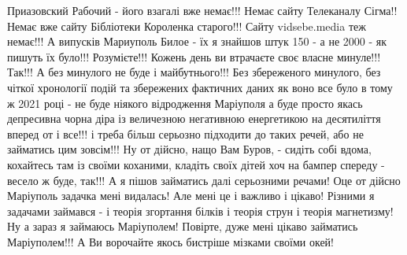 Приазовский Рабочий - його взагалі вже немає!!! Немає сайту Телеканалу Сігма!!
Немає вже сайту Бібліотеки Короленка старого!!! Сайту vidsebe.media теж
немає!!!  А випусків Мариуполь Билое - їх я знайшов штук 150 - а не 2000 - як
пишуть їх було!!!  Розумієте!!! Кожень день ви втрачаєте своє власне минуле!!!
Так!!! А без минулого не буде і майбутнього!!!  Без збереженого минулого, без
чіткої хронології подій та збережених фактичних даних як воно все було в тому ж
2021 році - не буде ніякого відродження Маріуполя а буде просто якась
депресивна чорна діра із величезною негативною енергетикою на десятиліття
вперед от і все!!!  і треба більш серьозно підходити до таких речей, або не
займатись цим зовсім!!!  Ну от дійсно, нащо Вам Буров, - сидіть собі вдома,
кохайтесь там із своїми коханими, кладіть своїх дітей хоч на бампер спереду -
весело ж буде, так!!!  А я пішов займатись далі серьозними речами! Оце от
дійсно Маріуполь задачка мені видалась! Але мені це і важливо і цікаво!
Різними я задачами займався - і теорія згортання білків і теорія струн і теорія
магнетизму!  Ну а зараз я займаюсь Маріуполем!  Повірте, дуже мені цікаво
займатись Маріуполем!!! А Ви ворочайте якось бистріше мізками своїми окей!

